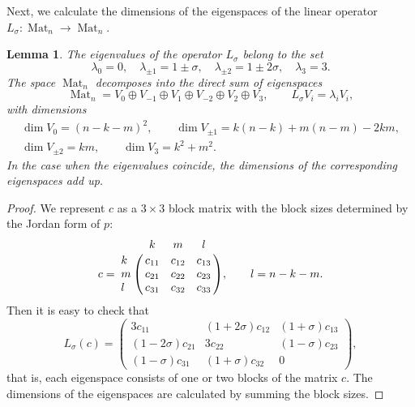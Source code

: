\documentclass{article}
\theoremstyle{plain}
\newtheorem{lemma}[theorem]{Lemma}
\theoremstyle{definition}
\DeclareMathOperator{\Mat}{Mat}
\begin{document}
Next, we calculate the dimensions of the eigenspaces of the linear operator $L_\sigma:\Mat_n\to\Mat_n$. 

\begin{lemma}\label{l:dim} 
The eigenvalues of the operator $L_\sigma$ belong to the set
\[
 \lambda_0=0,\quad \lambda_{\pm 1}=1\pm \sigma, \quad \lambda_{\pm 2}=1\pm 2 \sigma, \quad \lambda_3=3.
\]  
The space $\Mat_n$ decomposes into the direct sum of eigenspaces
\[
 \Mat_n=V_0\oplus V_{-1}\oplus V_1\oplus V_{-2}\oplus V_2\oplus V_3,\qquad L_\sigma V_i= \lambda_iV_i,
\]
with dimensions
\begin{gather*}
\dim V_0 = (n-k-m)^2, \qquad  \dim V_{\pm1} = k(n-k)+m(n-m) - 2 k m,\\  
\dim V_{\pm2} = k m, \qquad  \dim V_3 = k^2+m^2.
\end{gather*}
In the case when the eigenvalues coincide, the dimensions of the corresponding eigenspaces add up.
\end{lemma}

\begin{proof} 
We represent $c$ as a $3\times3$ block matrix with the block sizes determined by the Jordan form of $p$:
\[
 c=\bordermatrix{  
    & k      & m      & l \cr
  k & c_{11} & c_{12} & c_{13} \cr
  m & c_{21} & c_{22} & c_{23} \cr
  l & c_{31} & c_{32} & c_{33}},
 \qquad l=n-k-m.
\]
Then it is easy to check that
\[
 L_\sigma(c)=\begin{pmatrix}
  3c_{11} & (1+2\sigma)c_{12} & (1+\sigma)c_{13}\\ 
  (1-2\sigma)c_{21} & 3c_{22} & (1-\sigma)c_{23}\\ 
  (1-\sigma)c_{31}  & (1+\sigma)c_{32} & 0 
 \end{pmatrix},
\]
that is, each eigenspace consists of one or two blocks of the matrix $c$. The dimensions of the eigenspaces are calculated by summing the block sizes.
\end{proof}
\end{document}
